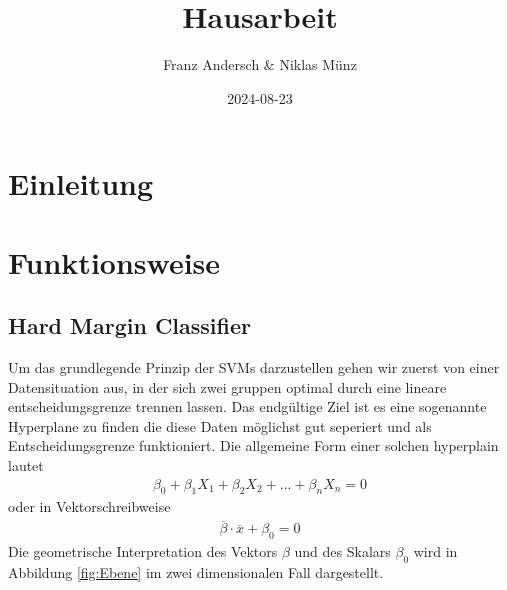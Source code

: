 \documentclass[
]{article}
\title{Hausarbeit}
\author{Franz Andersch \& Niklas Münz}
\date{2024-08-23}
\renewcommand{\maketitle}{}
\begin{document}
\maketitle


\newpage
\tableofcontents
\thispagestyle{empty}
\clearpage
{}
\section{Einleitung}
\section{Funktionsweise}

\subsection{Hard Margin Classifier}

Um das grundlegende Prinzip der SVMs darzustellen gehen wir zuerst von
einer Datensituation aus, in der sich zwei gruppen optimal durch eine
lineare entscheidungsgrenze trennen lassen. Das endgültige Ziel ist es
eine sogenannte Hyperplane zu finden die diese Daten möglichst gut
seperiert und als Entscheidungsgrenze funktioniert. Die allgemeine Form
einer solchen hyperplain lautet \begin{align}
\beta_0+ \beta_1 X_1+\beta_2 X_2+...+\beta_n X_n=0\label{eq:hyperebene}
\end{align} oder in Vektorschreibweise \begin{align}
\overline{\beta}\cdot\overline{x}+\beta_0=0 \label{eq:hyperplanevec}
\end{align} Die geometrische Interpretation des Vektors \(\beta\) und
des Skalars \(\beta_0\) wird in Abbildung \ref{fig:Ebene} im zwei
dimensionalen Fall dargestellt.
\end{document}
